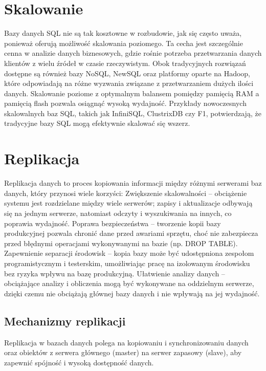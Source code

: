 \documentclass[a4paper,11pt,polish]{sphinxmanual}
\begin{document}
\section{Skalowanie}
\label{\detokenize{Wydajnosc-Skalowanie-i-Replikacja/index:skalowanie}}
\sphinxAtStartPar
Bazy danych SQL nie są tak kosztowne w rozbudowie, jak się często uważa, ponieważ oferują możliwość skalowania poziomego. Ta cecha jest szczególnie cenna w analizie danych biznesowych, gdzie rośnie potrzeba przetwarzania danych klientów z wielu źródeł w czasie rzeczywistym. Obok tradycyjnych rozwiązań dostępne są również bazy NoSQL, NewSQL oraz platformy oparte na Hadoop, które odpowiadają na różne wyzwania związane z przetwarzaniem dużych ilości danych. Skalowanie poziome z optymalnym balansem pomiędzy pamięcią RAM a pamięcią flash pozwala osiągnąć wysoką wydajność. Przykłady nowoczesnych skalowalnych baz SQL, takich jak InfiniSQL, ClustrixDB czy F1, potwierdzają, że tradycyjne bazy SQL mogą efektywnie skalować się wszerz.


\section{Replikacja}
\label{\detokenize{Wydajnosc-Skalowanie-i-Replikacja/index:replikacja}}
\sphinxAtStartPar
Replikacja danych to proces kopiowania informacji między różnymi serwerami baz danych, który przynosi wiele korzyści:
\sphinxhyphen{} Zwiększenie skalowalności – obciążenie systemu jest rozdzielane między wiele serwerów; zapisy i aktualizacje odbywają się na jednym serwerze, natomiast odczyty i wyszukiwania na innych, co poprawia wydajność.
\sphinxhyphen{} Poprawa bezpieczeństwa – tworzenie kopii bazy produkcyjnej pozwala chronić dane przed awariami sprzętu, choć nie zabezpiecza przed błędnymi operacjami wykonywanymi na bazie (np. DROP TABLE).
\sphinxhyphen{} Zapewnienie separacji środowisk – kopia bazy może być udostępniona zespołom programistycznym i testerskim, umożliwiając pracę na izolowanym środowisku bez ryzyka wpływu na bazę produkcyjną.
\sphinxhyphen{} Ułatwienie analizy danych – obciążające analizy i obliczenia mogą być wykonywane na oddzielnym serwerze, dzięki czemu nie obciążają głównej bazy danych i nie wpływają na jej wydajność.


\subsection{Mechanizmy replikacji}
\label{\detokenize{Wydajnosc-Skalowanie-i-Replikacja/index:mechanizmy-replikacji}}
\sphinxAtStartPar
Replikacja w bazach danych polega na kopiowaniu i synchronizowaniu danych oraz obiektów z serwera głównego (master) na serwer zapasowy (slave), aby zapewnić spójność i wysoką dostępność danych.
\end{document}
